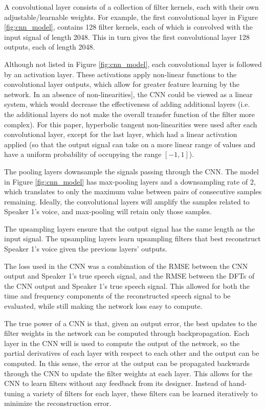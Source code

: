 \documentclass[12pt,chapterheads]{ucsd}
\begin{document}
A convolutional layer consists of a collection of filter kernels, each with their own adjustable/learnable weights. For example, the first convolutional layer in Figure \ref{fig:cnn_model}, contains 128 filter kernels, each of which is convolved with the input signal of length 2048. This in turn gives the first convolutional layer 128 outputs, each of length 2048.

Although not listed in Figure \ref{fig:cnn_model}, each convolutional layer is followed by an activation layer. These activations apply non-linear functions to the convolutional layer outputs, which allow for greater feature learning by the network. In an absence of non-linearities], the CNN could be viewed as a linear system, which would decrease the effectiveness of adding additional layers (i.e. the additional layers do not make the overall transfer function of the filter more complex). For this paper, hyperbolic tangent non-linearities were used after each convolutional layer, except for the last layer, which had a linear activation applied (so that the output signal can take on a more linear range of values and have a uniform probability of occupying the range $[-1, 1]$).

The pooling layers downsample the signals passing through the CNN. The model in Figure \ref{fig:cnn_model} has max-pooling layers and a downsampling rate of 2, which translates to only the maximum value between pairs of consecutive samples remaining. Ideally, the convolutional layers will amplify the samples related to Speaker 1's voice, and max-pooling will retain only those samples.

The upsampling layers ensure that the output signal has the same length as the input signal. The upsampling layers learn upsampling filters that best reconstruct Speaker 1's voice given the previous layers' outputs.

The loss used in the CNN was a combination of the RMSE between the CNN output and Speaker 1's true speech signal, and the RMSE between the DFTs of the CNN output and Speaker 1's true speech signal. This allowed for both the time and frequency components of the reconstructed speech signal to be evaluated, while still making the network loss easy to compute.

The true power of a CNN is that, given an output error, the best updates to the filter weights in the network can be computed through backpropagation. Each layer in the CNN will is used to compute the output of the network, so the partial derivatives of each layer with respect to each other and the output can be computed. In this sense, the error at the output can be propagated backwards through the CNN to update the filter weights at each layer. This allows for the CNN to learn filters without any feedback from its designer. Instead of hand-tuning a variety of filters for each layer, these filters can be learned iteratively to minimize the reconstruction error.
\end{document}
